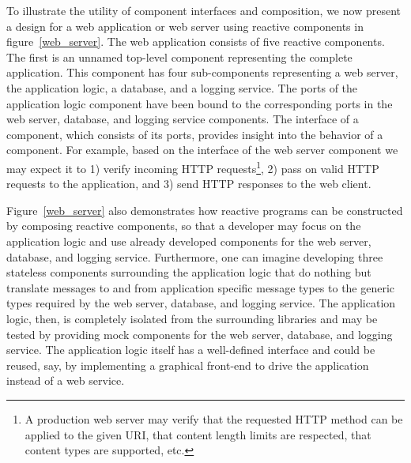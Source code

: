 To illustrate the utility of component interfaces and composition, we now present a design for a web application or web server using reactive components in figure~\ref{web_server}.
The web application consists of five reactive components.
The first is an unnamed top-level component representing the complete application.
This component has four sub-components representing a web server, the application logic, a database, and a logging service.
The ports of the application logic component have been bound to the corresponding ports in the web server, database, and logging service components.
The interface of a component, which consists of its ports, provides insight into the behavior of a component.
For example, based on the interface of the web server component we may expect it to 1) verify incoming HTTP requests\footnote{A production web server may verify that the requested HTTP method can be applied to the given URI, that content length limits are respected, that content types are supported, etc.}, 2) pass on valid HTTP requests to the application, and 3) send HTTP responses to the web client.

Figure~\ref{web_server} also demonstrates how reactive programs can be constructed by composing reactive components, so that a developer may focus on the application logic and use already developed components for the web server, database, and logging service.
Furthermore, one can imagine developing three stateless components surrounding the application logic that do nothing but translate messages to and from application specific message types to the generic types required by the web server, database, and logging service.
The application logic, then, is completely isolated from the surrounding libraries and may be tested by providing mock components for the web server, database, and logging service.
The application logic itself has a well-defined interface and could be reused, say, by implementing a graphical front-end to drive the application instead of a web service.

